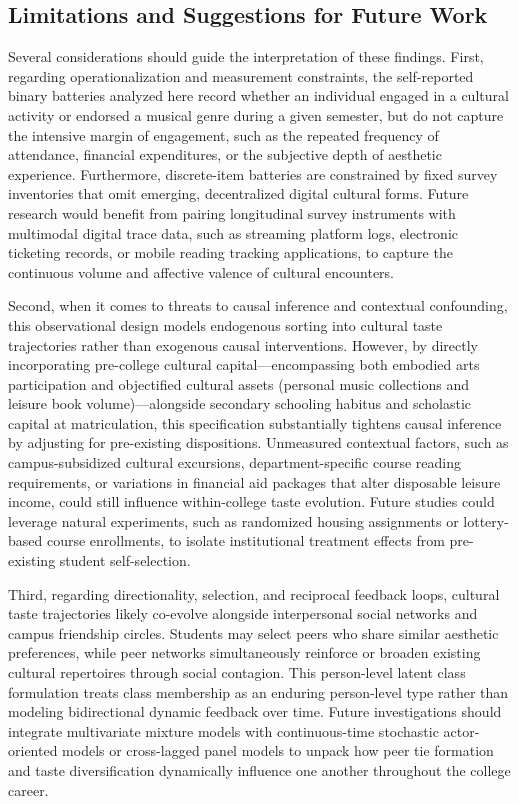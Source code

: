 \documentclass[12pt]{article}
\begin{document}
\subsection{Limitations and Suggestions for Future Work}

Several considerations should guide the interpretation of these findings. First, regarding operationalization and measurement constraints, the self-reported binary batteries analyzed here record whether an individual engaged in a cultural activity or endorsed a musical genre during a given semester, but do not capture the intensive margin of engagement, such as the repeated frequency of attendance, financial expenditures, or the subjective depth of aesthetic experience. Furthermore, discrete-item batteries are constrained by fixed survey inventories that omit emerging, decentralized digital cultural forms. Future research would benefit from pairing longitudinal survey instruments with multimodal digital trace data, such as streaming platform logs, electronic ticketing records, or mobile reading tracking applications, to capture the continuous volume and affective valence of cultural encounters.

Second, when it comes to threats to causal inference and contextual confounding, this observational design models endogenous sorting into cultural taste trajectories rather than exogenous causal interventions. However, by directly incorporating pre-college cultural capital---encompassing both embodied arts participation and objectified cultural assets (personal music collections and leisure book volume)---alongside secondary schooling habitus and scholastic capital at matriculation, this specification substantially tightens causal inference by adjusting for pre-existing dispositions. Unmeasured contextual factors, such as campus-subsidized cultural excursions, department-specific course reading requirements, or variations in financial aid packages that alter disposable leisure income, could still influence within-college taste evolution. Future studies could leverage natural experiments, such as randomized housing assignments or lottery-based course enrollments, to isolate institutional treatment effects from pre-existing student self-selection.

Third, regarding directionality, selection, and reciprocal feedback loops, cultural taste trajectories likely co-evolve alongside interpersonal social networks and campus friendship circles. Students may select peers who share similar aesthetic preferences, while peer networks simultaneously reinforce or broaden existing cultural repertoires through social contagion. This person-level latent class formulation treats class membership as an enduring person-level type rather than modeling bidirectional dynamic feedback over time. Future investigations should integrate multivariate mixture models with continuous-time stochastic actor-oriented models or cross-lagged panel models to unpack how peer tie formation and taste diversification dynamically influence one another throughout the college career.
\end{document}
